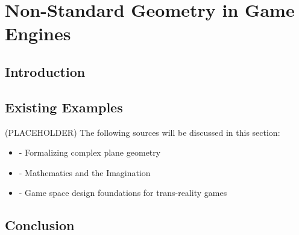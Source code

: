 \section{Non-Standard Geometry in Game Engines}
\label{lr:ne}

\begin{multicols*}{2}
	\subsection{Introduction}
	\label{lr:ne:intro}
	
	\subsection{Existing Examples}
	\label{lr:ne:existing}
		(PLACEHOLDER) The following sources will be discussed in this section:
		\begin{itemize}
			\item \cite{Maric2014} - Formalizing complex plane geometry
			\item \cite{Turner2009} - Mathematics and the Imagination
			\item \cite{Lindley2005} - Game space design foundations for trans-reality games
		\end{itemize}
		
	\subsection{Conclusion}
	\label{lr:ne:conclusion}
		
\end{multicols*}
